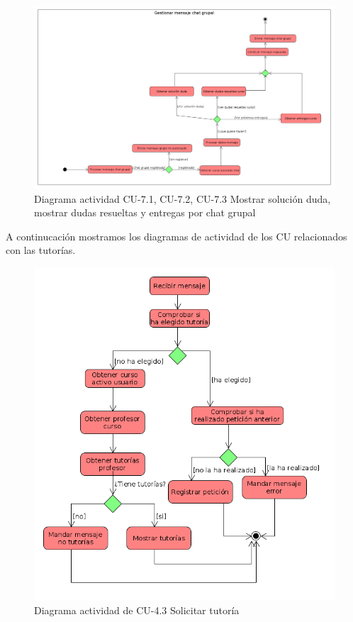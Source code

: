         \begin{figure}[H] %
\centering
\includegraphics[scale=0.25]{imagenes/diagramas/actividad/mensaje_chat_grupall.png}  %

\caption{Diagrama actividad CU-7.1, CU-7.2, CU-7.3  Mostrar solución duda, mostrar dudas resueltas y entregas por chat grupal}\label{figura141}
\end{figure}

A continucación mostramos los diagramas de actividad de los CU relacionados con las tutorías.

        \begin{figure}[H] %
\centering
\includegraphics[scale=0.5]{imagenes/diagramas/actividad/realizar_peticon_tutoriaa.png}  %

\caption{Diagrama actividad de CU-4.3 Solicitar tutoría}\label{figura143}
\end{figure}

